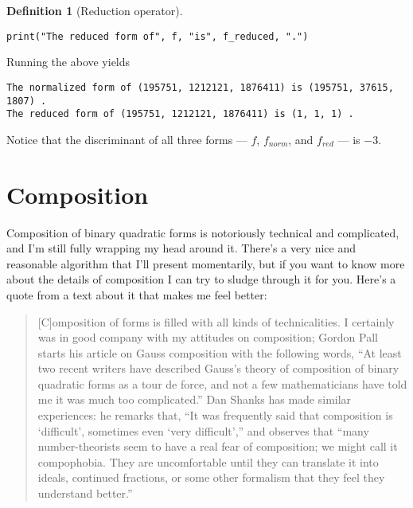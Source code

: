 \documentclass{article}
\theoremstyle{definition}
\newtheorem{definition}{Definition}[section]
\theoremstyle{theorem}
\theoremstyle{example}
\theoremstyle{corollary}
\begin{document}
\begin{definition}[Reduction operator]
\begin{verbatim}
print("The reduced form of", f, "is", f_reduced, ".")
\end{verbatim}

\bigskip

\hline

\bigskip

Running the above yields

\begin{verbatim}
The normalized form of (195751, 1212121, 1876411) is (195751, 37615, 1807) .
The reduced form of (195751, 1212121, 1876411) is (1, 1, 1) .
\end{verbatim}

\bigskip

Notice that the discriminant of all three forms --- \(f\), \(f_{norm}\), and \(f_{red}\) --- is \(-3\).





\bigskip




\section{Composition}

\bigskip

Composition of binary quadratic forms is notoriously technical and complicated, and I'm still fully wrapping my head around it. There's a very nice and reasonable algorithm that I'll present momentarily, but if you want to know more about the details of composition I can try to sludge through it for you. Here's a quote from a text about it that makes me feel better:

\bigskip

\begin{quote}
[C]omposition of forms is filled with all kinds of technicalities. I certainly was in good company with my attitudes on composition; Gordon Pall starts his article on Gauss composition with the following words, ``At least two recent writers have described Gauss's theory of composition of binary quadratic forms as a tour de force, and not a few mathematicians have told me it was much too complicated.'' Dan Shanks has made similar experiences: he remarks that, ``It was frequently said that composition is `difficult', sometimes even `very difficult','' and observes that ``many number-theorists seem to have a real fear of composition; we might call it compophobia. They are uncomfortable until they can translate it into ideals, continued fractions, or some other formalism that they feel they understand better.''
\end{quote}


\end{definition}
\end{document}
